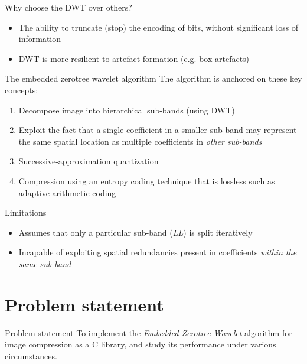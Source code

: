 \documentclass{beamer}
\begin{document}
\begin{frame}{Why choose the DWT over others?}
    \begin{itemize}
        \item The ability to truncate (stop) the encoding of bits, without
            significant loss of information
        \item DWT is more resilient to artefact formation (e.g. box artefacts)
    \end{itemize}
\end{frame}

\begin{frame}{The embedded zerotree wavelet algorithm}
    The algorithm is anchored on these key concepts: \cite{shap1993, sayood_datac}
    \vspace{0.5cm}

    \begin{enumerate}
        \item Decompose image into hierarchical sub-bands (using DWT)
        \item Exploit the fact that a single coefficient in a smaller sub-band
            may represent the same spatial location as multiple coefficients in
            \textit{other sub-bands}
        \item Successive-approximation quantization
        \item Compression using an entropy coding technique that is lossless
            such as adaptive arithmetic coding
    \end{enumerate}
\end{frame}

\begin{frame}{Limitations}
    \begin{itemize}
        \item Assumes that only a particular sub-band (\textit{LL}) is split iteratively
        \item Incapable of exploiting spatial redundancies present in
            coefficients \textit{within the same sub-band}
    \end{itemize}
\end{frame}

\section{Problem statement}
\begin{frame}{Problem statement}
    To implement the \textit{Embedded Zerotree Wavelet} algorithm for image
    compression as a C library, and study its performance under various
    circumstances.
\end{frame}
\end{document}
